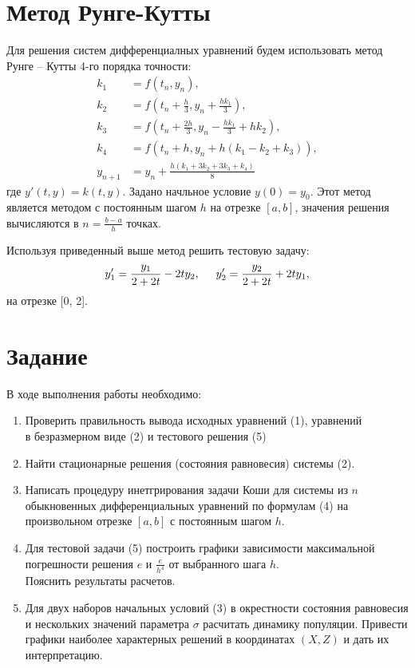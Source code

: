 \documentclass[a4paper,12pt]{article}
\begin{document}
\section{Метод Рунге-Кутты}
\hspace{0.5cm} Для решения систем дифференциалных уравнений будем использовать
метод Рунге -- Кутты 4-го порядка точности:
\begin{align}
    k_1 &= f(t_n, y_n), \nonumber \\
    k_2 &= f(t_n + \frac{h}{3}, y_n + \frac{hk_1}{3}), \nonumber \\
    k_3 &= f(t_n + \frac{2h}{3}, y_n - \frac{hk_1}{3} + hk_2),\\
    k_4 &= f(t_n + h, y_n + h(k_1 - k_2 + k_3)), \nonumber \\
    y_{n+1} &= y_n + \frac{h(k_1 + 3k_2 + 3k_3+ k_4)}{8} \nonumber
\end{align}
где $y'(t,y) = k(t,y)$. Задано начльное условие $y(0) = y_0$. Этот метод является методом
с постоянным шагом $h$ на отрезке $[a, b]$, значения решения вычисляются в $n = \frac{b-a}{h}$ точках.

Используя приведенный выше метод решить тестовую задачу:
\begin{equation}
    y'_1 = \frac{y_1}{2 + 2t} - 2ty_2, \hspace{0.5cm} y'_2 = \frac{y_2}{2 + 2t} + 2ty_1,
\end{equation}
на отрезке [0, 2].

\newpage
\section{Задание}
\hspace{0.5cm} В ходе выполнения работы необходимо:
\begin{enumerate}
    \item Проверить правильность вывода исходных уравнений (1), уравнений \\
    в безразмерном виде (2) и тестового решения (5)
    \item Найти стационарные решения (состояния равновесия) системы (2).
    \item Написать процедуру инетгрирования задачи Коши для системы из $n$ \\
    обыкновенных дифференциальных уравнений по формулам (4) на произвольном отрезке
    $[a, b]$ с постоянным шагом $h$.
    \item Для тестовой задачи (5) построить графики зависимости максимальной\\
    погрешности решения $e$ и $\frac{e}{h^4}$ от выбранного шага $h$. \\
    Пояснить результаты расчетов.
    \item Для двух наборов начальных условий (3) в окрестности состояния равновесия и нескольких значений
    параметра $\sigma$ расчитать динамику популяции. Привести графики наиболее характерных решений в координатах $(X, Z)$ и дать их \\
    интерпретацию.
\end{enumerate}
\newpage
\end{document}
